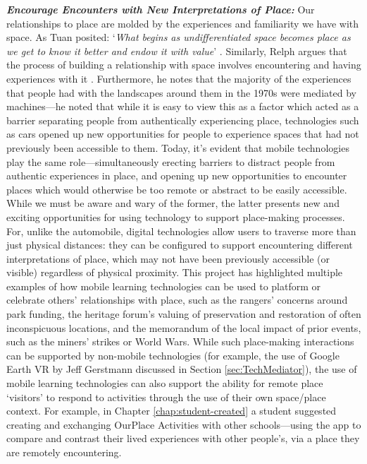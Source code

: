 \textbf{\textit{Encourage Encounters with New Interpretations of Place:}}  Our relationships to place are molded by the experiences and familiarity we have with space. As Tuan posited: `\textit{What begins as undifferentiated space becomes place as we get to know it better and endow it with value}' \citep{Tuan1978}. Similarly, Relph argues that the process of building a relationship with space involves encountering and having experiences with it \citep{Relph1976}. Furthermore, he notes that the majority of the experiences that people had with the landscapes around them in the 1970s were mediated by machines---he noted that while it is easy to view this as a factor which acted as a barrier separating people from authentically experiencing place, technologies such as cars opened up new opportunities for people to experience spaces that had not previously been accessible to them. Today, it's evident that mobile technologies play the same role---simultaneously erecting barriers to distract people from authentic experiences in place, and opening up new opportunities to encounter places which would otherwise be too remote or abstract to be easily accessible. While we must be aware and wary of the former, the latter presents new and exciting opportunities for using technology to support place-making processes. For, unlike the automobile, digital technologies allow users to traverse more than just physical distances: they can be configured to support encountering different interpretations of place, which may not have been previously accessible (or visible) regardless of physical proximity. This project has highlighted multiple examples of how mobile learning technologies can be used to platform or celebrate others' relationships with place, such as the rangers' concerns around park funding, the heritage forum's valuing of preservation and restoration of often inconspicuous locations, and the memorandum of the local impact of prior events, such as the miners' strikes or World Wars. While such place-making interactions can be supported by non-mobile technologies (for example, the use of Google Earth VR by Jeff Gerstmann discussed in Section \ref{sec:TechMediator}), the use of mobile learning technologies can also support the ability for remote place `visitors' to respond to activities through the use of their own space/place context. For example, in Chapter \ref{chap:student-created} a student suggested creating and exchanging OurPlace Activities with other schools---using the app to compare and contrast their lived experiences with other people's, via a place they are remotely encountering. 

